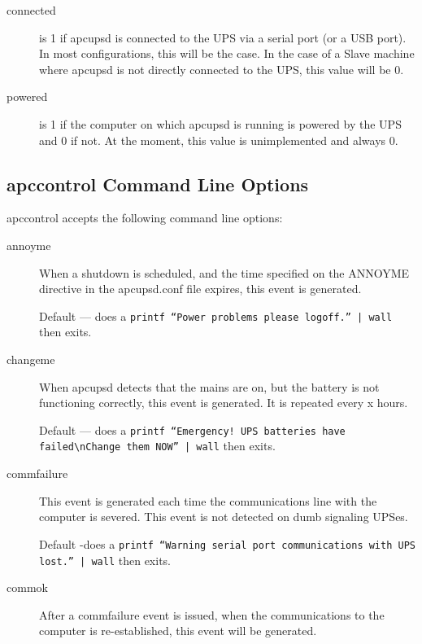 {{{{{{{{\begin{description}
\item [connected]
   is 1 if apcupsd is connected to the UPS via a serial port (or a USB port). In
most configurations, this will be the case. In the case of a Slave machine
where apcupsd is not directly connected to the UPS, this value will be 0.  

\item [powered]
   is 1 if the computer on which apcupsd is running is powered by the UPS and 0
if not.  At the moment, this value is unimplemented and always 0. 
\end{description}

\label{apccontrol-Command-Line-Options}

\subsection*{apccontrol Command Line Options}

apccontrol accepts the following command line options:  

\begin{description}

\item [annoyme]
   When a shutdown is scheduled, and the time specified on the ANNOYME directive
in the apcupsd.conf file expires, this event is generated.  

Default {---} does a {\tt printf ``Power problems please logoff.'' | wall}
then exits.  

\item [changeme]
   When apcupsd detects that the mains are on, but the battery is not functioning
correctly, this event is generated. It is repeated every x hours.  

Default {---} does a {\tt printf ``Emergency! UPS batteries have
failed\textbackslash{}nChange them NOW'' | wall} then exits.  

\item [commfailure]
   This event is generated each time the communications line with the computer is
severed. This event is not detected on dumb signaling UPSes.  

Default -does a {\tt printf ``Warning serial port communications with UPS
lost.'' | wall} then exits.  

\item [commok]
   After a commfailure event is issued, when the communications to the computer
is re-established, this event will be generated.  


\end{description}}}}}}}}}
